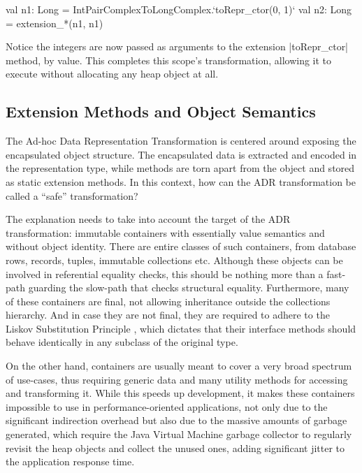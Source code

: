 \begin{lstlisting-nobreak}
val n1: Long = IntPairComplexToLongComplex.`toRepr_ctor(0, 1)`
val n2: Long = extension_*(n1, n1)
\end{lstlisting-nobreak}

Notice the integers are now passed as arguments to the extension |toRepr_ctor| method, by value. This completes this scope's transformation, allowing it to execute without allocating any heap object at all.

\subsection{Extension Methods and Object Semantics}

The Ad-hoc Data Representation Transformation is centered around exposing the encapsulated object structure. The encapsulated data is extracted and encoded in the representation type, while methods are torn apart from the object and stored as static extension methods. In this context, how can the ADR transformation be called a ``safe'' transformation?

The explanation needs to take into account the target of the ADR transformation: immutable containers with essentially value semantics and without object identity. There are entire classes of such containers, from database rows, records, tuples, immutable collections etc. Although these objects can be involved in referential equality checks, this should be nothing more than a fast-path guarding the slow-path that checks structural equality. Furthermore, many of these containers are final, not allowing inheritance outside the collections hierarchy. And in case they are not final, they are required to adhere to the Liskov Substitution Principle \cite{liskov-substitution-principle}, which dictates that their interface methods should behave identically in any subclass of the original type.

On the other hand, containers are usually meant to cover a very broad spectrum of use-cases, thus requiring generic data and many utility methods for accessing and transforming it. While this speeds up development, it makes these containers impossible to use in performance-oriented applications, not only due to the significant indirection overhead but also due to the massive amounts of garbage generated, which require the Java Virtual Machine garbage collector to regularly revisit the heap objects and collect the unused ones, adding significant jitter to the application response time.

